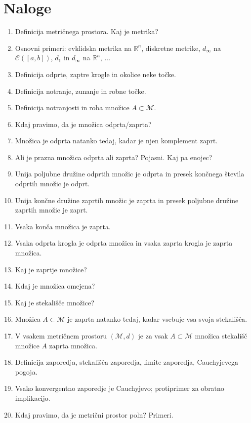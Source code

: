 \documentclass[a4paper,12pt]{report}
\begin{document}
\section*{Naloge}

\begin{enumerate}
    \item Definicija metričnega prostora. Kaj je metrika?
    \item Osnovni primeri: evklidska metrika na $\mathbb{R}^n$, diskretne metrike, $d_{\infty}$ na $\mathcal{C}([a, b])$, $d_1$ in $d_{\infty}$ na $\mathbb{R}^n$, ...
    \item Definicija odprte, zaptre krogle in okolice neke točke.
    \item Definicija notranje, zunanje in robne točke.
    \item Definicija notranjosti in roba množice $A \subset \mathcal{M}$.
    \item Kdaj pravimo, da je množica odprta/zaprta?
    \item Množica je odprta natanko tedaj, kadar je njen komplement zaprt.
    \item Ali je prazna množica odprta ali zaprta? Pojasni. Kaj pa enojec?
    \item Unija poljubne družine odprtih množic je odprta in presek končnega števila odprtih množic je odprt.
    \item Unija končne družine zaprtih množic je zaprta in presek poljubne družine zaprtih množic je zaprt.
    \item Vsaka konča množica je zaprta.
    \item Vsaka odprta krogla je odprta množica in vsaka zaprta krogla je zaprta množica.
    \item Kaj je zaprtje množice?
    \item Kdaj je množica omejena?
    \item Kaj je stekališče množice?
    \item Množica $A \subset \mathcal{M}$ je zaprta natanko tedaj, kadar vsebuje vsa svoja stekališča.
    \item V vsakem metričnem prostoru $(\mathcal{M}, d)$ je za vsak $A \subset \mathcal{M}$ množica stekališč množice $A$ zaprta množica.
    \item Definicija zaporedja, stekališča zaporedja, limite zaporedja, Cauchyjevega pogoja.
    \item Vsako konvergentno zaporedje je Cauchyjevo; protiprimer za obratno implikacijo.
    \item Kdaj pravimo, da je metrični prostor poln? Primeri.

\end{enumerate}
\end{document}
